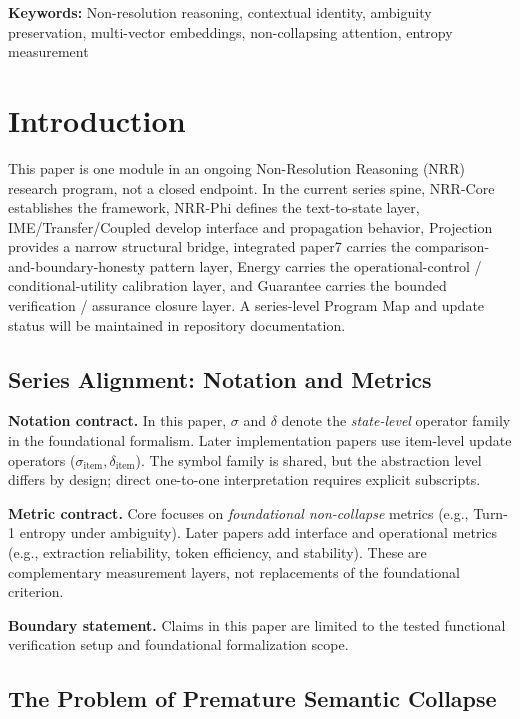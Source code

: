 \documentclass[11pt,a4paper]{article}
\begin{document}
\noindent\textbf{Keywords:} Non-resolution reasoning, contextual identity, ambiguity preservation, multi-vector embeddings, non-collapsing attention, entropy measurement

\section{Introduction}

This paper is one module in an ongoing Non-Resolution Reasoning (NRR) research program, not a closed endpoint. In the current series spine, NRR-Core establishes the framework, NRR-Phi defines the text-to-state layer, IME/Transfer/Coupled develop interface and propagation behavior, Projection provides a narrow structural bridge, integrated paper7 carries the comparison-and-boundary-honesty pattern layer, Energy carries the operational-control / conditional-utility calibration layer, and Guarantee carries the bounded verification / assurance closure layer. A series-level Program Map and update status will be maintained in repository documentation.

\subsection{Series Alignment: Notation and Metrics}

\textbf{Notation contract.} In this paper, $\sigma$ and $\delta$ denote the
\emph{state-level} operator family in the foundational formalism. Later
implementation papers use item-level update operators
($\sigma_{\text{item}}, \delta_{\text{item}}$). The symbol family is shared, but
the abstraction level differs by design; direct one-to-one interpretation
requires explicit subscripts.

\textbf{Metric contract.} Core focuses on \emph{foundational non-collapse}
metrics (e.g., Turn-1 entropy under ambiguity). Later papers add interface and
operational metrics (e.g., extraction reliability, token efficiency, and
stability). These are complementary measurement layers, not replacements of the
foundational criterion.

\textbf{Boundary statement.} Claims in this paper are limited to the tested
functional verification setup and foundational formalization scope.

\subsection{The Problem of Premature Semantic Collapse}
\end{document}
